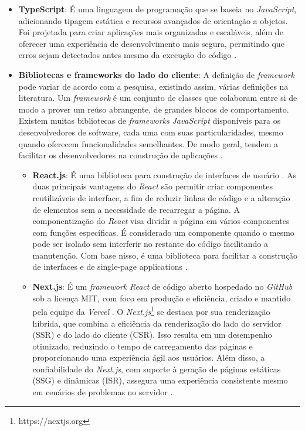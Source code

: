 \begin{itemize}
    \item \textbf{TypeScript}: É uma linguagem de programação que se baseia no \textit{JavaScript}, adicionando tipagem estática e recursos avançados de orientação a objetos. Foi projetada para criar aplicações mais organizadas e escaláveis, além de oferecer uma experiência de desenvolvimento mais segura, permitindo que erros sejam detectados antes mesmo da execução do código \cite{microsoft2025}.
    \item \textbf{Bibliotecas e frameworks do lado do cliente}: A definição de \textit{framework} pode variar de acordo com a pesquisa, existindo assim, várias definições na literatura. Um \textit{framework} é um conjunto de classes que colaboram entre si de modo a prover um reúso abrangente, de grandes blocos de comportamento. Existem muitas bibliotecas de \textit{frameworks} \textit{JavaScript} disponíveis para os desenvolvedores de software, cada uma com suas particularidades, mesmo quando oferecem funcionalidades semelhantes. De modo geral, tendem a facilitar os desenvolvedores na construção de aplicações \cite{silva2022comparaccao}.
    \begin{itemize}
        \item \textbf{React.js}: É uma biblioteca para construção de interfaces de usuário \cite{react2025}. As duas principais vantagens do \textit{React} são permitir criar componentes reutilizáveis de interface, a fim de reduzir linhas de código e a alteração de elementos sem a necessidade de recarregar a página. A componentização do \textit{React} visa dividir a página em vários componentes com funções específicas. É considerado um componente quando o mesmo pode ser isolado sem interferir no restante do código facilitando a manutenção. Com base nisso, é uma biblioteca para facilitar a construção de interfaces e de single-page applications \cite{LorenaUFOP2021}.
        \item \textbf{Next.js}: É um \textit{framework} \textit{React} de código aberto hospedado no \textit{GitHub} sob a licença MIT, com foco em produção e eficiência, criado e mantido pela equipe da \textit{Vercel} \cite{nextjs2025}. O \textit{Next.js}\footnote{https://nextjs.org} se destaca por sua renderização híbrida, que combina a eficiência da renderização do lado do servidor (SSR) e do lado do cliente (CSR). Isso resulta em um desempenho otimizado, reduzindo o tempo de carregamento das páginas e proporcionando uma experiência ágil aos usuários. Além disso, a confiabilidade do \textit{Next.js}, com suporte à geração de páginas estáticas (SSG) e dinâmicas (ISR), assegura uma experiência consistente mesmo em cenários de problemas no servidor \cite{bento2024sistema}.

\end{itemize}
\end{itemize}
